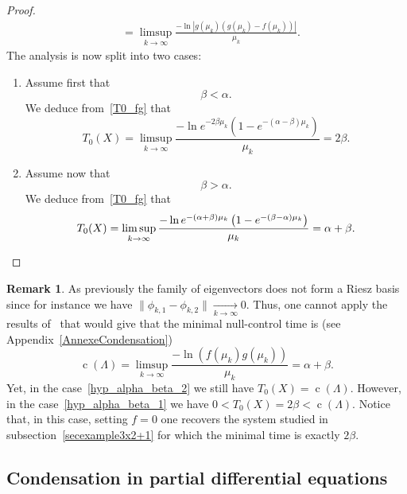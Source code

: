 \documentclass[11pt]{article}
\theoremstyle{definition}
\newtheorem{rema}[theo]{Remark}
\numberwithin{equation}{section}
\numberwithin{figure}{section}
\numberwithin{table}{section}
\DeclareMathOperator{\cond}{c}
\begin{document}
\begin{proof}
\begin{equation}
\begin{aligned}
&= \limsup_{k \to \infty} \frac{ -\ln \left| g(\mu_k) (g(\mu_k) - f(\mu_k)) \right| }{\mu_k}.
\end{aligned}
\end{equation}
The analysis is now split into two cases:
\begin{enumerate}
\item \label{list-pr-prop5.7.1}Assume first that
\begin{equation}\label{hyp_alpha_beta_1}
\beta < \alpha.
\end{equation}
We deduce from~\eqref{T0_fg} that
\[
T_0(X) = \limsup_{k \to \infty} \frac{ -\ln e^{-2\beta \mu_k} \left(1- e^{-(\alpha-\beta) \mu_k} \right) }{\mu_k} = 2 \beta.
\]
\item \label{list-pr-prop5.7.2}Assume now that
\begin{equation}\label{hyp_alpha_beta_2}
\beta > \alpha.
\end{equation}
We deduce from~\eqref{T0_fg} that
\[
T_0(X) = \limsup_{k \to \infty} \frac{ -\ln e^{-(\alpha+\beta) \mu_k} \left(1- e^{-(\beta-\alpha) \mu_k} \right) }{\mu_k} = \alpha + \beta.\qedhere
\]
\end{enumerate}
\end{proof}



\begin{rema}
As previously the family of eigenvectors does not form a Riesz basis since for instance we have $\| \phi_{k,1} - \phi_{k,2} \| \underset{k \to \infty}{\longrightarrow} 0$. Thus, one cannot apply the results of~\cite{AmmarKhodjaBenabdallahGonzalez-BurgosdeTeresa:2014} that would give that the minimal null-control time is (see Appendix~\ref{AnnexeCondensation})
\[
\cond(\Lambda)=\limsup_{k \to \infty} \frac{-\ln \left(f(\mu_k)g(\mu_k)\right)}{\mu_k} = \alpha + \beta.
\]
Yet, in the case~\eqref{hyp_alpha_beta_2} we still have $T_0(X)=\cond(\Lambda)$. However, in the case~\eqref{hyp_alpha_beta_1} we have $0<T_0(X) = 2 \beta < \cond(\Lambda)$. Notice that, in this case, setting $f=0$ one recovers the system studied in subsection~\ref{secexample3x2+1} for which the minimal time is exactly $2\beta$.
\end{rema}



\subsection{Condensation in partial differential equations} \label{Subsec:ExemplesEDP}
\end{document}
